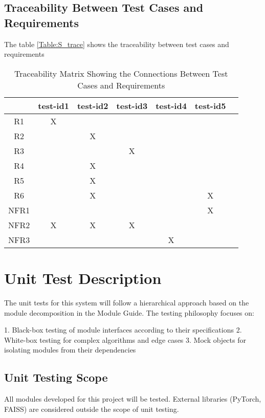 \documentclass[12pt, titlepage]{article}
\begin{document}
\subsection{Traceability Between Test Cases and Requirements}

The table \ref{Table:S_trace}
 shows the traceability between test cases and requirements

\begin{table}[h!]\label{Table:S_trace}
  \centering
  \begin{tabular}{|c|c|c|c|c|c|c|}
  \hline
    & test-id1& test-id2& test-id3&test-id4&test-id5 \\
  \hline
  R1        & X&  & & &  \\ \hline
  R2        & & X& & &  \\ \hline
  R3        & & & X& & \\ \hline
  R4        & & X& & & \\ \hline
  R5        & &X & & & \\ \hline
  R6        & &X & & & X\\ \hline
  NFR1      & & & & &  X\\ \hline
  NFR2      &X & X& X& & \\ \hline
  NFR3      & & & &X & \\ \hline
  \end{tabular}
  \caption{Traceability Matrix Showing the Connections Between Test Cases and Requirements}
  \label{Table:A_trace}
  \end{table}

\section{Unit Test Description}\label{UnitTest}

The unit tests for this system will follow a hierarchical approach based on the module decomposition in the Module Guide. The testing philosophy focuses on:

1. Black-box testing of module interfaces according to their specifications
2. White-box testing for complex algorithms and edge cases
3. Mock objects for isolating modules from their dependencies

\subsection{Unit Testing Scope}
All modules developed for this project will be tested. External libraries (PyTorch, FAISS) are considered outside the scope of unit testing.
\end{document}
